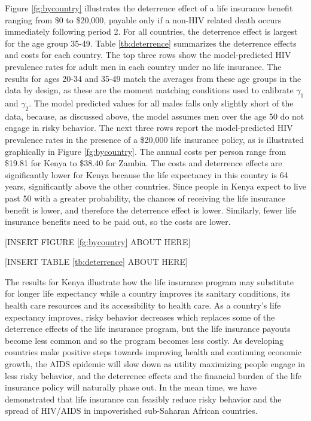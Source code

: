 \documentclass[12pt]{article}
\begin{document}
Figure \ref{fg:bycountry} illustrates the deterrence effect of a life insurance benefit ranging from \$0 to \$20,000, payable only if a non-HIV related death occurs immediately following period 2.  For all countries, the deterrence effect is largest for the age group 35-49.  Table \ref{tb:deterrence} summarizes the deterrence effects and costs for each country.  The top three rows show the model-predicted HIV prevalence rates for adult men in each country under no life insurance.  The results for ages 20-34 and 35-49 match the averages from these age groups in the data by design, as these are the moment matching conditions used to calibrate $\gamma_1$ and $\gamma_2$.  The model predicted values for all males falls only slightly short of the data, because, as discussed above, the model assumes men over the age 50 do not engage in risky behavior.  The next three rows report the model-predicted HIV prevalence rates in the presence of a \$20,000 life insurance policy, as is illustrated graphically in Figure \ref{fg:bycountry}.  The annual costs per person range from \$19.81 for Kenya to \$38.40 for Zambia.  The costs and deterrence effects are significantly lower for Kenya because the life expectancy in this country is 64 years, significantly above the other countries.  Since people in Kenya expect to live past 50 with a greater probability, the chances of receiving the life insurance benefit is lower, and therefore the deterrence effect is lower.  Similarly, fewer life insurance benefits need to be paid out, so the costs are lower.

\begin{center}[INSERT FIGURE \ref{fg:bycountry} ABOUT HERE]\end{center}
\begin{center}[INSERT TABLE \ref{tb:deterrence} ABOUT HERE]\end{center}

The results for Kenya illustrate how the life insurance program may substitute for longer life expectancy while a country improves its sanitary conditions, its health care resources and its accessibility to health care.  As a country's life expectancy improves, risky behavior decreases which replaces some of the deterrence effects of the life insurance program, but the life insurance payouts become less common and so the program becomes less costly.  As developing countries make positive steps towards improving health and continuing economic growth, the AIDS epidemic will slow down as utility maximizing people engage in less risky behavior, and the deterrence effects and the financial burden of the life insurance policy will naturally phase out.  In the mean time, we have demonstrated that life insurance can feasibly reduce risky behavior and the spread of HIV/AIDS in impoverished sub-Saharan African countries.
\end{document}
